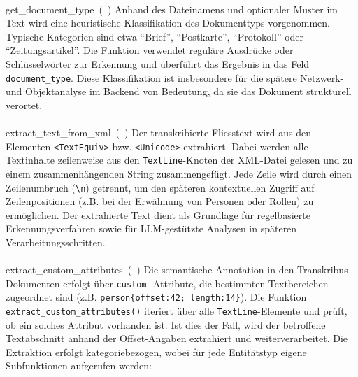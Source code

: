 \documentclass[12pt, a4paper, ngerman, bidi=default]{article}
\makeatletter
\newcommand{\code}[1]{\colorbox{VeryLightGray}{\texttt{#1}}} %
\let\oldparagraph\paragraph%
\renewcommand{\paragraph}{
    \@ifstar%
      \xxxParagraphStar%
      \xxxParagraphNoStar%
 }
\newcommand{\xxxParagraphStar}[1]{\oldparagraph*{#1}\mbox{}}
\newcommand{\xxxParagraphNoStar}[1]{\oldparagraph{#1}\mbox{}}
\makeatother
\begin{document}
\paragraph{get\_document\_type~(~)} Anhand des Dateinamens und optionaler Muster im Text wird eine heuristische Klassifikation 
des Dokumenttyps vorgenommen. Typische Kategorien sind etwa \enquote{Brief}, \enquote{Postkarte}, \enquote{Protokoll} oder 
\enquote{Zeitungsartikel}. Die Funktion verwendet reguläre Ausdrücke oder Schlüsselwörter zur Erkennung und überführt das Ergebnis 
in das Feld \code{document\_type}. Diese Klassifikation ist insbesondere für die spätere Netzwerk- und Objektanalyse im Backend von 
Bedeutung, da sie das Dokument strukturell verortet.

\paragraph{extract\_text\_from\_xml~(~)} Der transkribierte Fliesstext wird aus den Elementen \code{<TextEquiv>} bzw. 
\code{<Unicode>} extrahiert. Dabei werden alle Textinhalte zeilenweise aus den \code{TextLine}-Knoten der XML-Datei gelesen und zu 
einem zusammenhängenden String zusammengefügt. Jede Zeile wird durch einen Zeilenumbruch (\code{\textbackslash n}) getrennt, um den 
späteren kontextuellen Zugriff auf Zeilenpositionen (z.B. bei der Erwähnung von Personen oder Rollen) zu ermöglichen. Der extrahierte 
Text dient als Grundlage für regelbasierte Erkennungsverfahren sowie für LLM-gestützte Analysen in späteren Verarbeitungsschritten.

\paragraph{extract\_custom\_attributes~(~)} Die semantische Annotation in den Transkribus-Dokumenten erfolgt über \code{custom}-
Attribute, die bestimmten Textbereichen zugeordnet sind (z.B. \code{person\{offset:42; length:14\}}). Die Funktion 
\code{extract\_custom\_attributes()} iteriert über alle \code{TextLine}-Elemente und prüft, ob ein solches Attribut vorhanden ist. 
Ist dies der Fall, wird der betroffene Textabschnitt anhand der Offset-Angaben extrahiert und weiterverarbeitet. Die Extraktion 
erfolgt kategoriebezogen, wobei für jede Entitätstyp eigene Subfunktionen aufgerufen werden:
\end{document}
